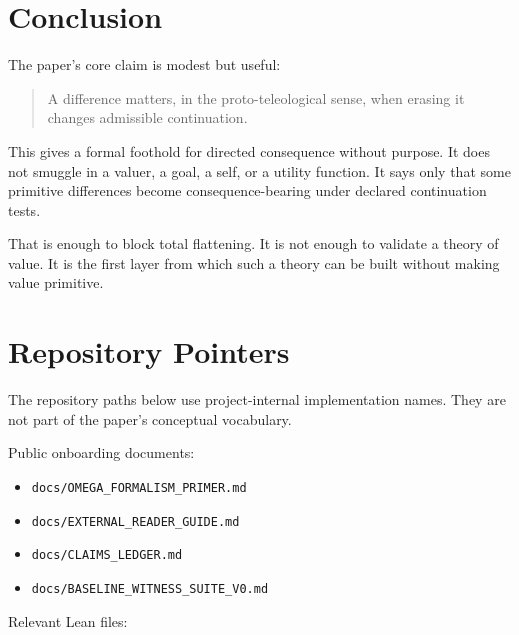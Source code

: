 \documentclass[11pt]{article}
\begin{document}
\section{Conclusion}

The paper's core claim is modest but useful:

\begin{quote}
A difference matters, in the proto-teleological sense, when erasing it changes
admissible continuation.
\end{quote}

This gives a formal foothold for directed consequence without purpose. It does
not smuggle in a valuer, a goal, a self, or a utility function. It says only
that some primitive differences become consequence-bearing under declared
continuation tests.

That is enough to block total flattening. It is not enough to validate a theory
of value. It is the first layer from which such a theory can be built without
making value primitive.

\appendix

\section{Repository Pointers}

The repository paths below use project-internal implementation names. They are
not part of the paper's conceptual vocabulary.

Public onboarding documents:

\begin{itemize}[leftmargin=*]
  \item \texttt{docs/OMEGA\_FORMALISM\_PRIMER.md}
  \item \texttt{docs/EXTERNAL\_READER\_GUIDE.md}
  \item \texttt{docs/CLAIMS\_LEDGER.md}
  \item \texttt{docs/BASELINE\_WITNESS\_SUITE\_V0.md}
\end{itemize}

Relevant Lean files:
\end{document}
